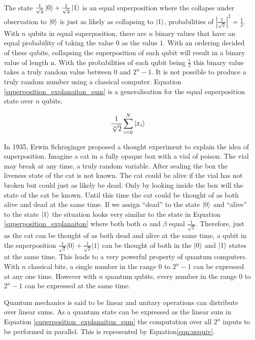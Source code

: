The state $\frac{1}{\sqrt{2}}\left\vert{0}\right\rangle+\frac{1}{\sqrt{2}}\left\vert{1}\right\rangle$ is an equal superposition where the collapse under observation to $\left\vert{0}\right\rangle$ is just as likely as collapsing to $\left\vert{1}\right\rangle$, probabilities of $|\frac{1}{\sqrt{2}}|^2=\frac{1}{2}$.
With $n$ qubits in equal superposition, there are $n$ binary values that have an equal probability of taking the value $0$ as the value $1$.
With an ordering decided of these qubits, collapsing the superposition of each qubit will result in a binary value of length n.
With the probabilities of each qubit being $\frac{1}{2}$ this binary value takes a truly random value between $0$ and $2^n-1$.
It is not possible to produce a truly random number using a classical computer.
Equation \ref{superposition_explanaiton_sum} is a generalisation for the equal superposition state over $n$ qubits.

\begin{equation}
\label{superposition_explanaiton_sum}
\frac{1}{\sqrt[n]{2}}\sum\limits_{i=0}^N \left\vert{x_i}\right\rangle
\end{equation}

In 1935, Erwin Schr$\ddot{o}$ginger\cite{SchroedingersCat} proposed a thought experiment to explain the idea of superposition.
Imagine a cat in a fully opaque box with a vial of poison.
The vial may break at any time, a truly random variable.
After sealing the box the liveness state of the cat is not known.
The cat could be alive if the vial has not broken but could just as likely be dead.
Only by looking inside the box will the state of the cat be known.
Until this time the cat could be thought of as both alive and dead at the same time.
If we assign ``dead'' to the state $\left\vert{0}\right\rangle$ and ``alive'' to the state $\left\vert{1}\right\rangle$ the situation looks very similar to the state in Equation \ref{superposition_explanaiton} where both both $\alpha$ and $\beta$ equal $\frac{1}{\sqrt{2}}$.
Therefore, just as the cat can be thought of as both dead and alive at the same time, a qubit in the superposition $\frac{1}{\sqrt{2}}\vert0\rangle+\frac{1}{\sqrt{2}}\vert1\rangle$ can be thought of both in the $\left\vert{0}\right\rangle$ and $\left\vert{1}\right\rangle$ states at the same time.
This leads to a very powerful property of quantum computers.
With $n$ classical bits, a single number in the range $0$ to $2^n-1$ can be expressed at any one time.
However with $n$ quantum qubits, every number in the range $0$ to $2^n-1$ can be expressed at the same time.

Quantum mechanics is said to be linear and unitary operations can distribute over linear sums.
As a quantum state can be expressed as the linear sum in Equation \ref{superposition_explanaiton_sum} the computation over all $2^n$ inputs to be performed in parallel.
This is represented by Equation\ref{eqn:uequiv}.%

